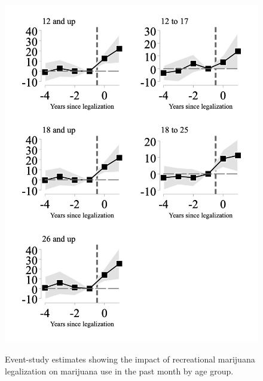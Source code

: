 \documentclass[12pt]{article}%
\begin{document}
\begin{figure}[h]
    \caption{Event-study estimates showing the impact of recreational marijuana legalization on marijuana use in the past month by age group.}
    \includegraphics[width=.75\linewidth]{../output/plots/figure_3.png}
    \label{fig:leads-and-lags-mj-past-month}
\end{figure}
\end{document}
